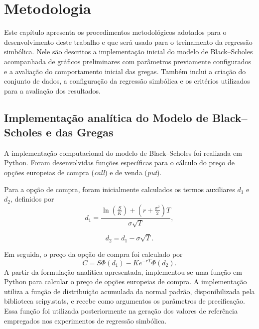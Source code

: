 \section{Metodologia}

Este capítulo apresenta os procedimentos metodológicos adotados para o desenvolvimento deste trabalho e que será usado para o treinamento da regressão simbólica. Nele são descritos a implementação inicial do modelo de Black--Scholes acompanhada de gráficos preliminares com parâmetros previamente configurados e a avaliação do comportamento inicial das gregas. Também inclui a criação do conjunto de dados,
a configuração da regressão simbólica e os critérios utilizados para a
avaliação dos resultados.

\subsection{Implementação analítica do Modelo de Black--Scholes e das Gregas}
A implementação computacional do modelo de Black--Scholes foi realizada em
Python. Foram desenvolvidas funções específicas para o cálculo do preço de
opções europeias de compra (\textit{call}) e de venda (\textit{put}).

Para a opção de compra, foram inicialmente calculados os termos auxiliares
$d_1$ e $d_2$, definidos por
\begin{equation}
d_1 =
\frac{
\ln\left(\frac{S}{K}\right)
+
\left(r+\frac{\sigma^2}{2}\right)T
}{
\sigma\sqrt{T}
},
\end{equation}

\begin{equation}
d_2 = d_1 - \sigma\sqrt{T}.
\end{equation}

Em seguida, o preço da opção de compra foi calculado por
\begin{equation}
C =
S\Phi(d_1)
-
Ke^{-rT}\Phi(d_2).
\end{equation}
A partir da formulação analítica apresentada, implementou-se uma função em Python para calcular o preço de opções europeias de compra. A implementação utiliza a função de distribuição acumulada da normal padrão, disponibilizada pela biblioteca scipy.stats, e recebe como argumentos os parâmetros de precificação. Essa função foi utilizada posteriormente na geração dos valores de referência empregados nos experimentos de regressão simbólica.



